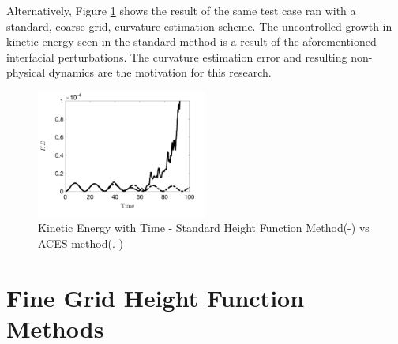 Alternatively, Figure \ref{fig:stdKE} shows the result of the same test case ran with a standard, coarse grid, curvature estimation scheme. The uncontrolled growth in kinetic energy seen in the standard method is a result of the aforementioned interfacial perturbations. The curvature estimation error and resulting non-physical dynamics are the motivation for this research. 
\begin{figure}[htpb]
	\centering
	\includegraphics[width=0.5\textwidth]{figs/stdHt_KEplot.png}
	\caption{Kinetic Energy with Time - Standard Height Function Method(-) vs ACES method(.-)}
	\label{fig:stdKE}
\end{figure}
 
 \section{Fine Grid Height Function Methods}
